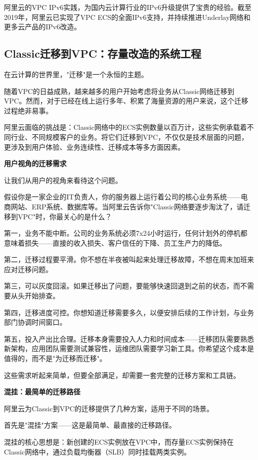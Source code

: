 阿里云的VPC IPv6实践，为国内云计算行业的IPv6升级提供了宝贵的经验。截至2019年，阿里云已实现了VPC ECS的全面IPv6支持，并持续推进Underlay网络和更多云产品的IPv6改造。

\subsection{Classic迁移到VPC：存量改造的系统工程}

在云计算的世界里，"迁移"是一个永恒的主题。

随着VPC的日益成熟，越来越多的用户开始考虑将业务从Classic网络迁移到VPC。然而，对于已经在线上运行多年、积累了海量资源的用户来说，这个迁移过程绝非易事。

阿里云面临的挑战是：Classic网络中的ECS实例数量以百万计，这些实例承载着不同行业、不同规模客户的业务。将它们迁移到VPC，不仅仅是技术层面的问题，更涉及到用户体验、业务连续性、迁移成本等多方面因素。

\textbf{用户视角的迁移需求}

让我们从用户的视角来看待这个问题。

假设你是一家企业的IT负责人，你的服务器上运行着公司的核心业务系统——电商网站、ERP系统、数据库等。当阿里云告诉你"Classic网络要逐步淘汰了，请迁移到VPC"时，你最关心的是什么？

第一，业务不能中断。公司的业务系统必须7x24小时运行，任何计划外的停机都意味着损失——直接的收入损失、客户信任的下降、员工生产力的降低。

第二，迁移过程要平滑。你不想在半夜被叫起来处理迁移故障，不想在周末加班来应对迁移问题。

第三，可以灰度回滚。如果迁移出了问题，要能够快速回退到之前的状态，而不需要从头开始排查。

第四，迁移进度可控。你想知道迁移需要多久，以便安排后续的工作计划，与业务部门协调时间窗口。

第五，投入产出比合理。迁移本身需要投入人力和时间成本——迁移团队需要熟悉新架构，应用团队需要测试兼容性，运维团队需要学习新工具。你希望这个成本是值得的，而不是"为迁移而迁移"。

这些需求听起来简单，但要全部满足，却需要一套完整的迁移方案和工具链。

\textbf{混挂：最简单的迁移路径}

阿里云为Classic到VPC的迁移提供了几种方案，适用于不同的场景。

首先是"混挂"方案——这是最简单、最直接的迁移路径。

混挂的核心思想是：新创建的ECS实例放在VPC中，而存量ECS实例保持在Classic网络中，通过负载均衡器（SLB）同时挂载两类实例。

